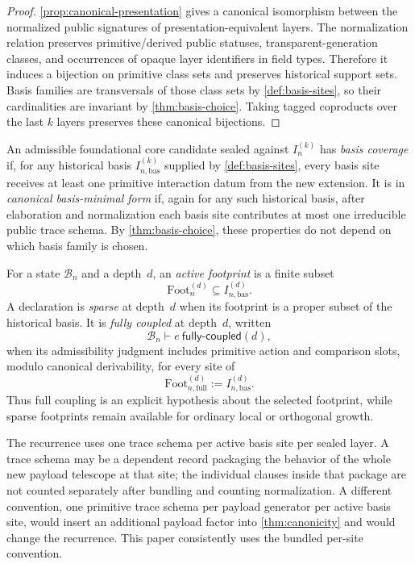 \documentclass{lmcs}
\newcommand{\B}{\mathcal{B}}
\newcommand{\Foot}{\mathrm{Foot}}
\begin{document}
\begin{proof}
\autoref{prop:canonical-presentation} gives a canonical isomorphism between
the normalized public signatures of presentation-equivalent layers. The
normalization relation preserves primitive/derived public statuses, transparent-generation
classes, and occurrences of opaque layer identifiers in field types. Therefore
it induces a bijection on primitive class sets and preserves historical support
sets. Basis families are transversals of those class sets by
\autoref{def:basis-sites}, so their cardinalities are invariant by
\autoref{thm:basis-choice}. Taking tagged coproducts over the last $k$ layers
preserves these canonical bijections.
\end{proof}

\begin{defi}
\label{def:max-density}
An admissible foundational core candidate sealed against $I_n^{(k)}$ has
\emph{basis coverage} if, for any historical basis
$I_{n,\mathrm{bas}}^{(k)}$ supplied by \autoref{def:basis-sites}, every basis
site receives at least one primitive interaction datum from the new extension.
It is in \emph{canonical basis-minimal form} if, again for any such historical
basis, after elaboration and normalization each basis site contributes at most
one irreducible public trace schema. By \autoref{thm:basis-choice}, these
properties do not depend on which basis family is chosen.
\end{defi}

\begin{defi}
\label{def:footprint}
For a state $\B_n$ and a depth~$d$, an \emph{active footprint} is a finite subset
\[
  \Foot_n^{(d)} \subseteq I_{n,\mathrm{bas}}^{(d)}.
\]
A declaration is \emph{sparse} at depth~$d$ when its footprint is a proper subset of the historical basis. It is \emph{fully coupled} at depth~$d$, written
\[
  \B_n \vdash e\ \mathsf{fully\text{-}coupled}(d),
\]
when its admissibility judgment includes primitive action and comparison slots, modulo canonical derivability, for every site of
\[
  \Foot_{n,\mathrm{full}}^{(d)} := I_{n,\mathrm{bas}}^{(d)}.
\]
Thus full coupling is an explicit hypothesis about the selected footprint, while sparse footprints remain available for ordinary local or orthogonal growth.
\end{defi}

\begin{rem}
\label{rem:trace-counting-convention}
The recurrence uses one trace schema per active basis site per sealed layer. A trace schema may be a dependent record packaging the behavior of the whole new payload telescope at that site; the individual clauses inside that package are not counted separately after bundling and counting normalization. A different convention, one primitive trace schema per payload generator per active basis site, would insert an additional payload factor into \autoref{thm:canonicity} and would change the recurrence. This paper consistently uses the bundled per-site convention.
\end{rem}
\end{document}
